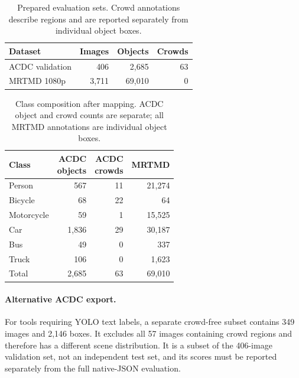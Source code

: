 \begin{table}[t]
  \centering
  \small
  \caption{Prepared evaluation sets. Crowd annotations describe regions and
  are reported separately from individual object boxes.}
  \label{tab:zero-shot-dataset-sizes}
  \begin{tabular}{lrrr}
    \toprule
    Dataset & Images & Objects & Crowds \\
    \midrule
    ACDC validation & 406 & 2,685 & 63 \\
    MRTMD 1080p & 3,711 & 69,010 & 0 \\
    \bottomrule
  \end{tabular}
\end{table}

\begin{table}[t]
  \centering
  \small
  \caption{Class composition after mapping. ACDC object and crowd counts are
  separate; all MRTMD annotations are individual object boxes.}
  \label{tab:zero-shot-class-counts}
  \begin{tabular}{lrrr}
    \toprule
    Class & \shortstack{ACDC\\objects} & \shortstack{ACDC\\crowds} & MRTMD \\
    \midrule
    Person & 567 & 11 & 21,274 \\
    Bicycle & 68 & 22 & 64 \\
    Motorcycle & 59 & 1 & 15,525 \\
    Car & 1,836 & 29 & 30,187 \\
    Bus & 49 & 0 & 337 \\
    Truck & 106 & 0 & 1,623 \\
    \midrule
    Total & 2,685 & 63 & 69,010 \\
    \bottomrule
  \end{tabular}
\end{table}

\paragraph{Alternative ACDC export.}
For tools requiring YOLO text labels, a separate crowd-free subset contains
349 images and 2,146 boxes. It excludes all 57 images containing crowd regions
and therefore has a different scene distribution. It is a subset of the
406-image validation set, not an independent test set, and its scores must be
reported separately from the full native-JSON evaluation.


